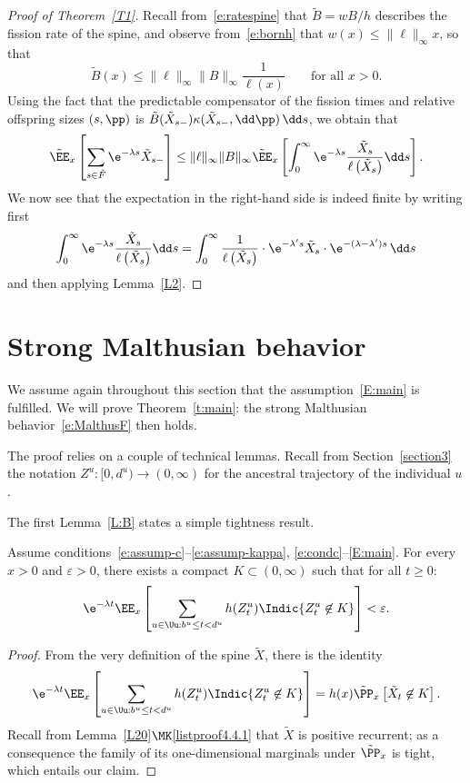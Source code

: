 \begin{proof}[Proof of Theorem~\ref{T1}]
Recall from~\eqref{e:ratespine} that $\tilde {B} = w{B}/h$ describes the fission rate of the spine, and observe from~\eqref{e:bornh} that $w(x)\leq \| \ell\|_{\infty} x$, so that
\[
\tilde {B}(x) \leq \| \ell\|_{\infty} \| {B} \|_{\infty}
\frac{1}{\ell(x)}
\qquad \text{for all }x>0.
\]
Using the fact that the predictable compensator of the fission times and relative offspring sizes $(s,\pp)$ is $\tilde{B}(\tilde{X}_{s-}) \kappa(\tilde{X}_{s-},\dd \pp)\,\dd s$, we obtain that
\[
\tilde \EE_x \left[\sum_{s\in \tilde F} \e^{-\lambda s} \tilde X_{s-}\right] \leq
\| \ell\|_{\infty} \| {B} \|_{\infty}\tilde \EE_x\left[\int_0^{\infty} \e^{-\lambda s} \frac{\tilde X_s}{\ell\left(\tilde X_s\right)}\dd s\right].
\]
We now see that the expectation in the right-hand side is indeed finite by writing first
\[
\int_0^{\infty} \e^{-\lambda s} \frac{\tilde X_s}{\ell\left(\tilde X_s\right)}\dd s
= \int_0^{\infty} \frac{1}{\ell\left(\tilde X_s\right)} \cdot \e^{-\lambda' s}\tilde X_s
\cdot \e^{-(\lambda-\lambda')s} \, \dd s
\]
and then applying Lemma~\ref{L2}.
\end{proof}



\section{Strong Malthusian behavior}\label{section5}

We assume again throughout this section that the assumption~\eqref{E:main} is fulfilled. We will prove Theorem~\ref{t:main}: the strong Malthusian behavior~\eqref{e:MalthusF} then holds.


The proof relies on a couple of technical lemmas. Recall from Section~\eqref{section3} the notation $Z^u\colon [0, d^u)\to(0,\infty)$ for the ancestral trajectory of the individual $u$.

The first Lemma~\ref{L:B} states a simple tightness result.

\begin{lemm}\label{L:B}
Assume conditions~\eqref{e:assump-c}--\eqref{e:assump-kappa}, \eqref{e:condc}--\eqref{E:main}. For every $x>0$ and $\varepsilon >0$, there exists a compact $K\subset (0,\infty)$ such that for all $t\geq 0$:
\[
\e^{-\lambda t} \EE_{x}\left[\sum_{u\in\Uu: b^u\leq t < d^u } h(Z^u_t) \Indic{Z^u_t\not\in K}
\right]< \varepsilon.
\]
\end{lemm}

\begin{proof}
From the very definition of the spine $\tilde X$, there is the identity
\[
\e^{-\lambda t} \EE_{x}\left[\sum_{u\in\Uu: b^u\leq t < d^u } h(Z^u_t) \Indic{Z^u_t\not\in K}
\right] = h(x) \tilde \PP_{x}\left[\tilde X_t\not\in K\right].
\]
Recall from Lemma~\ref{L20}$\MK$\eqref{listproof4.4.1} that $\tilde X$ is positive recurrent; as a consequence the family of its one-dimensional marginals under $\tilde \PP_{x}$ is tight, which entails our claim.
\end{proof}


